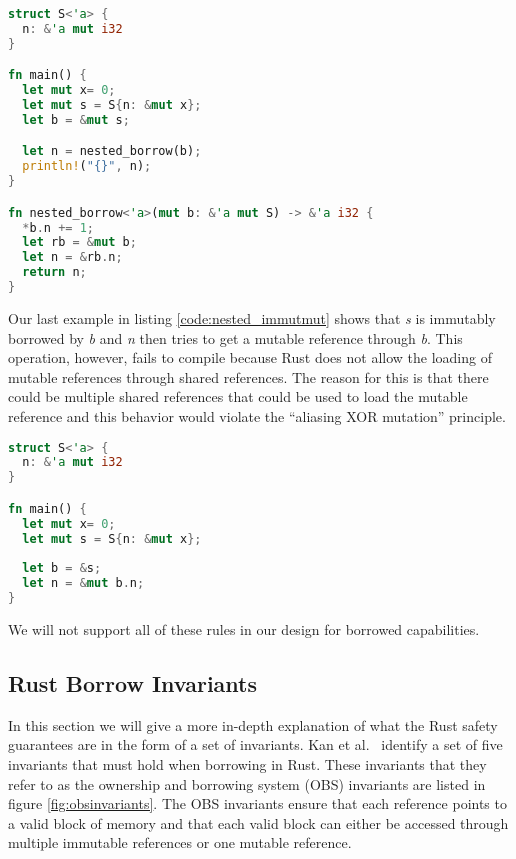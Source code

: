 \begin{lstlisting}[language=Rust,frame=single,caption=Reborrow Example,label=code:nested_lifetime]
struct S<'a> {
  n: &'a mut i32
}

fn main() {
  let mut x= 0;
  let mut s = S{n: &mut x};
  let b = &mut s;

  let n = nested_borrow(b);
  println!("{}", n);
}

fn nested_borrow<'a>(mut b: &'a mut S) -> &'a i32 {
  *b.n += 1;
  let rb = &mut b;
  let n = &rb.n;
  return n;
}
\end{lstlisting}

Our last example in listing \ref{code:nested_immutmut} shows that \textit{s} is immutably borrowed by \textit{b} and \textit{n} then tries to get a mutable reference through \textit{b}.
This operation, however, fails to compile because Rust does not allow the loading of mutable references through shared references.
The reason for this is that there could be multiple shared references that could be used to load the mutable reference and this behavior would violate the ``aliasing XOR mutation'' principle.
\begin{lstlisting}[language=Rust,frame=single,caption=Mutable reference through shared borrow,label=code:nested_immutmut]
struct S<'a> {
  n: &'a mut i32
}

fn main() {
  let mut x= 0;
  let mut s = S{n: &mut x};
    
  let b = &s;
  let n = &mut b.n;
}
\end{lstlisting}

We will not support all of these rules in our design for borrowed capabilities.

\subsection{Rust Borrow Invariants}
\label{sec:obsinvariants}
In this section we will give a more in-depth explanation of what the Rust safety guarantees are in the form of a set of invariants.
Kan et al.\  \cite{Kan2018AnEO} identify a set of five invariants that must hold when borrowing in Rust.
These invariants that they refer to as the ownership and borrowing system (OBS) invariants are listed in figure \ref{fig:obsinvariants}.
The OBS invariants ensure that each reference points to a valid block of memory and that each valid block can either be accessed through multiple immutable references or one mutable reference.

